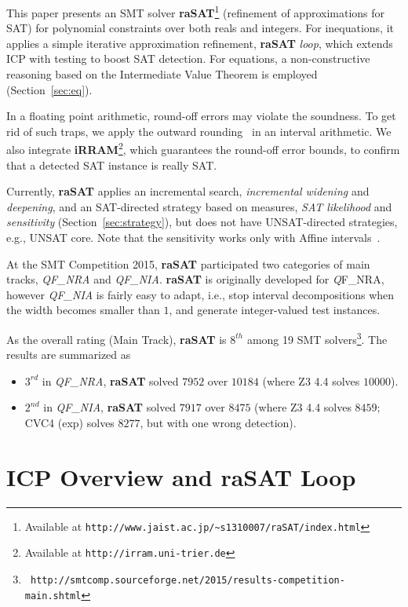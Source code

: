 \documentclass[runningheads,a4paper,oribibl]{llncs}
\begin{document}
This paper presents an SMT solver {\bf raSAT}\footnote{%
Available at {\tt http://www.jaist.ac.jp/\~{}s1310007/raSAT/index.html}}
(refinement of approximations for SAT) for polynomial constraints over
both reals and integers. 
For inequations, it applies a simple iterative approximation refinement,
{\bf raSAT} {\em loop}, which extends ICP with testing to boost 
SAT detection.
For equations, a non-constructive reasoning based on the Intermediate
Value Theorem is employed (Section~\ref{sec:eq}).

In a floating point arithmetic, round-off errors may violate the soundness.
To get rid of such traps, we apply the outward rounding~\cite{Hickey:2001:IAP:502102.502106}
in an interval arithmetic. 
We also integrate {\bf iRRAM}\footnote{Available at {\tt http://irram.uni-trier.de}}, 
which guarantees the round-off error bounds,
to confirm that a detected SAT instance is really SAT. 

Currently, {\bf raSAT} applies an incremental search, 
{\em incremental widening} and {\em deepening}, 
and an SAT-directed strategy based on measures, 
{\em SAT likelihood} and {\em sensitivity} (Section~\ref{sec:strategy}),
but does not have UNSAT-directed strategies, e.g., UNSAT core. 
Note that the sensitivity works only with Affine
intervals~\cite{Ngoc:2009:ORE:1685167.1685421}.

At the SMT Competition 2015, 
\textbf{raSAT} participated two categories of main tracks,
\emph{QF\_NRA} and \emph{QF\_NIA}.
{\bf raSAT} is originally developed for {\emph QF\_NRA},
however \emph{QF\_NIA} is fairly easy to adapt,
i.e., stop interval decompositions when the width becomes smaller than $1$,
and generate integer-valued test instances. 

As the overall rating (Main Track), 
{\bf raSAT} is $8^{th}$ among 19 SMT solvers\footnote{\tt %
http://smtcomp.sourceforge.net/2015/results-competition-main.shtml}.
The results are summarized as 
\begin{itemize}
\item $3^{rd}$ in \emph{QF\_NRA}, \textbf{raSAT} solved $7952$ over $10184$
(where Z3 4.4 solves $10000$). 
\item $2^{nd}$ in \emph{QF\_NIA}, \textbf{raSAT} solved $7917$ over $8475$
  (where Z3 4.4 solves $8459$; CVC4 (exp) solves $8277$, 
  but with one wrong detection).
\end{itemize}

\section{ICP Overview and \textbf{raSAT} Loop}
\label{sec:raSATloop} 
\end{document}
